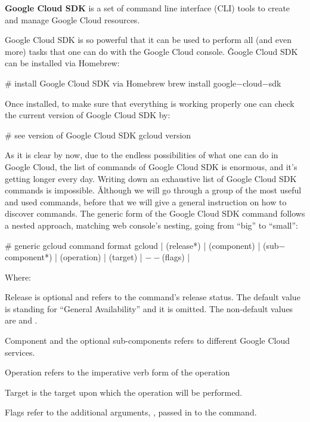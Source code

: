 \textbf{Google Cloud SDK} is a set of command line interface (CLI) tools to create and manage Google Cloud resources.
\ed

Google Cloud SDK is so powerful that it can be used to perform all (and even more) tasks that one can do with the
Google Cloud console. \v

Google Cloud SDK can be installed via Homebrew:
\begin{bash}
# install Google Cloud SDK via Homebrew
brew install google$-$cloud$-$sdk
\end{bash}

Once installed, to make sure that everything is working properly one can check the current version of Google Cloud
SDK by:
\begin{bash}
# see version of Google Cloud SDK
gcloud version
\end{bash}

As it is clear by now, due to the endless possibilities of what one can do in Google Cloud, the list of commands of
Google Cloud SDK is enormous, and it's getting longer every day. Writing down an exhaustive list of Google Cloud SDK
commands is impossible. \v

Although we will go through a group of the most useful and used commands, before that we will give a general instruction
on how to discover commands. The generic form of the Google Cloud SDK command follows a nested approach, matching web
console's nesting, going from ``big'' to ``small'':
\begin{bash}
# generic gcloud command format
gcloud | (release*) | (component) | (sub$-$component*) | (operation) | (target) | $--$(flags) |
\end{bash}

Where:
\bit
\item Release is optional and refers to the command’s release status. The default value is  standing for
``General Availability'' and it is omitted. The non-default values are  and .
\item Component and the optional sub-components refers to different Google Cloud services.
\item Operation refers to the imperative verb form of the operation
\item Target is the target upon which the operation will be performed.
\item Flags refer to the additional arguments, , passed in to the command.
\eit

